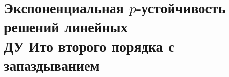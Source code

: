 

\chapter{Экспоненциальная $p$-устойчивость решений линейных \\ДУ Ито второго порядка с запаздыванием}




%
%
%
